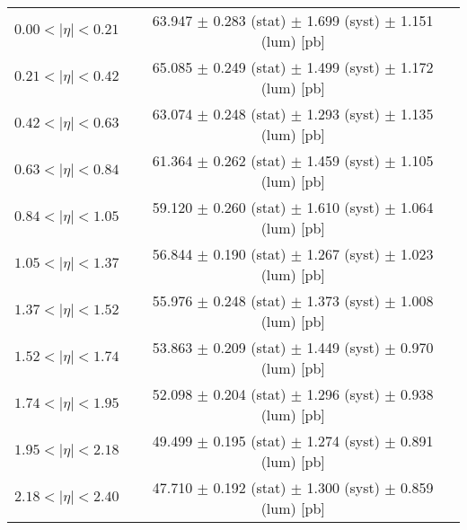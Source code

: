 \begin{tabular}{lc}
\hline
$0.00 < |\eta| <0.21$          & 63.947 $\pm$ 0.283 (stat) $\pm$ 1.699 (syst) $\pm$ 1.151 (lum) [pb]  \\
$0.21 < |\eta| <0.42$          & 65.085 $\pm$ 0.249 (stat) $\pm$ 1.499 (syst) $\pm$ 1.172 (lum) [pb]  \\
$0.42 < |\eta| <0.63$          & 63.074 $\pm$ 0.248 (stat) $\pm$ 1.293 (syst) $\pm$ 1.135 (lum) [pb]  \\
$0.63 < |\eta| <0.84$          & 61.364 $\pm$ 0.262 (stat) $\pm$ 1.459 (syst) $\pm$ 1.105 (lum) [pb]  \\
$0.84 < |\eta| <1.05$          & 59.120 $\pm$ 0.260 (stat) $\pm$ 1.610 (syst) $\pm$ 1.064 (lum) [pb]  \\
$1.05 < |\eta| <1.37$          & 56.844 $\pm$ 0.190 (stat) $\pm$ 1.267 (syst) $\pm$ 1.023 (lum) [pb]  \\
$1.37 < |\eta| <1.52$          & 55.976 $\pm$ 0.248 (stat) $\pm$ 1.373 (syst) $\pm$ 1.008 (lum) [pb]  \\
$1.52 < |\eta| <1.74$          & 53.863 $\pm$ 0.209 (stat) $\pm$ 1.449 (syst) $\pm$ 0.970 (lum) [pb]  \\
$1.74 < |\eta| <1.95$          & 52.098 $\pm$ 0.204 (stat) $\pm$ 1.296 (syst) $\pm$ 0.938 (lum) [pb]  \\
$1.95 < |\eta| <2.18$          & 49.499 $\pm$ 0.195 (stat) $\pm$ 1.274 (syst) $\pm$ 0.891 (lum) [pb]  \\
$2.18 < |\eta| <2.40$          & 47.710 $\pm$ 0.192 (stat) $\pm$ 1.300 (syst) $\pm$ 0.859 (lum) [pb]  \\
\hline
\end{tabular}
